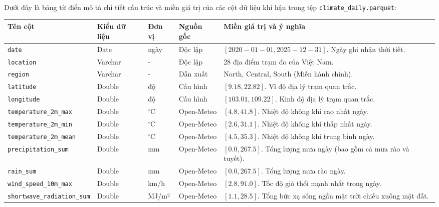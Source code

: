 Dưới đây là bảng từ điển mô tả chi tiết cấu trúc và miền giá trị của các cột dữ liệu khí hậu trong tệp \texttt{climate\_daily.parquet}:

\begin{longtable}{|p{}|p{}|p{}|p{}|p{}|}
\hline
\textbf{Tên cột} & \textbf{Kiểu dữ liệu} & \textbf{Đơn vị} & \textbf{Nguồn gốc} & \textbf{Miền giá trị và ý nghĩa} \\ \hline
\endhead
\texttt{date} & Date & ngày & Độc lập & $[2020-01-01, 2025-12-31]$. Ngày ghi nhận thời tiết. \\ \hline
\texttt{location} & Varchar & - & Độc lập & 28 địa điểm trạm đo của Việt Nam. \\ \hline
\texttt{region} & Varchar & - & Dẫn xuất & $\text{North, Central, South}$ (Miền hành chính). \\ \hline
\texttt{latitude} & Double & độ & Cấu hình & $[9.18, 22.82]$. Vĩ độ địa lý trạm quan trắc. \\ \hline
\texttt{longitude} & Double & độ & Cấu hình & $[103.01, 109.22]$. Kinh độ địa lý trạm quan trắc. \\ \hline
\texttt{temperature\_}\newline\texttt{2m\_max} & Double & $^\circ$C & Open-Meteo & $[4.8, 41.8]$. Nhiệt độ không khí cao nhất ngày. \\ \hline
\texttt{temperature\_}\newline\texttt{2m\_min} & Double & $^\circ$C & Open-Meteo & $[2.6, 31.1]$. Nhiệt độ không khí thấp nhất ngày. \\ \hline
\texttt{temperature\_}\newline\texttt{2m\_mean} & Double & $^\circ$C & Open-Meteo & $[4.5, 35.3]$. Nhiệt độ không khí trung bình ngày. \\ \hline
\texttt{precipitation\_}\newline\texttt{sum} & Double & mm & Open-Meteo & $[0.0, 267.5]$. Tổng lượng mưa ngày (bao gồm cả mưa rào và tuyết). \\ \hline
\texttt{rain\_sum} & Double & mm & Open-Meteo & $[0.0, 267.5]$. Tổng lượng mưa rào ngày. \\ \hline
\texttt{wind\_speed\_}\newline\texttt{10m\_max} & Double & km/h & Open-Meteo & $[2.8, 91.0]$. Tốc độ gió thổi mạnh nhất trong ngày. \\ \hline
\texttt{shortwave\_}\newline\texttt{radiation\_sum} & Double & MJ/m² & Open-Meteo & $[1.1, 28.5]$. Tổng bức xạ sóng ngắn mặt trời chiếu xuống mặt đất. \\ \hline
\end{longtable}

